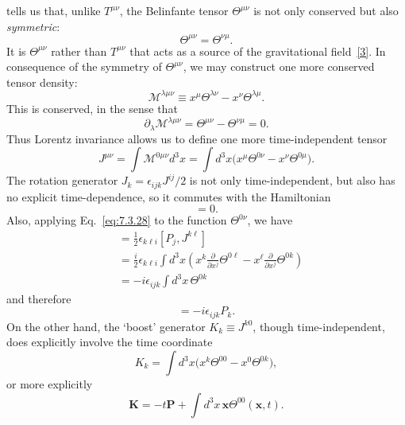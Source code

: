 tells us that, unlike $T^{\mu\nu}$, the Belinfante tensor $\Theta^{\mu\nu}$ is
not only conserved but also \emph{symmetric}:
\begin{equation}
\Theta^{\mu\nu}=\Theta^{\nu\mu}.
\tag{7.4.14}\label{eq:7.4.14}
\end{equation}
It is $\Theta^{\mu\nu}$ rather than $T^{\mu\nu}$ that acts as a source of the
gravitational field~\hyperref[ref:7.3]{[3]}. In consequence of the symmetry of $\Theta^{\mu\nu}$,
we may construct one more conserved tensor density:
\begin{equation}
\mathcal{M}^{\lambda\mu\nu}
\equiv x^\mu\Theta^{\lambda\nu}-x^\nu\Theta^{\lambda\mu}.
\tag{7.4.15}\label{eq:7.4.15}
\end{equation}
This is conserved, in the sense that
\begin{equation}
\partial_\lambda\mathcal{M}^{\lambda\mu\nu}
=\Theta^{\mu\nu}-\Theta^{\nu\mu}=0.
\tag{7.4.16}\label{eq:7.4.16}
\end{equation}
Thus Lorentz invariance allows us to define one more time-independent tensor
\begin{equation}
J^{\mu\nu}=\int\mathcal{M}^{0\mu\nu}d^3x
=\int d^3x\bigl(x^\mu\Theta^{0\nu}-x^\nu\Theta^{0\mu}\bigr).
\tag{7.4.17}\label{eq:7.4.17}
\end{equation}
The rotation generator $J_k=\epsilon_{ijk}J^{ij}/2$ is not only
time-independent, but also has no explicit time-dependence, so it commutes with
the Hamiltonian
\begin{equation}
[H,\mathbf{J}]=0.
\tag{7.4.18}\label{eq:7.4.18}
\end{equation}
Also, applying Eq.~\eqref{eq:7.3.28} to the function $\Theta^{0\nu}$, we have
\begin{align*}
[P_j,J_i]
&=\frac12\epsilon_{k\ell i}[P_j,J^{k\ell}]\\
&=\frac{i}{2}\epsilon_{k\ell i}\int d^3x\left(
x^k\frac{\partial}{\partial x^j}\Theta^{0\ell}
-x^\ell\frac{\partial}{\partial x^j}\Theta^{0k}\right)\\
&=-i\epsilon_{ijk}\int d^3x\,\Theta^{0k}
\end{align*}
and therefore
\begin{equation}
[P_j,J_i]=-i\epsilon_{ijk}P_k.
\tag{7.4.19}\label{eq:7.4.19}
\end{equation}
On the other hand, the `boost' generator $K_k\equiv J^{k0}$, though
time-independent, does explicitly involve the time coordinate
\[
K_k=\int d^3x\bigl(x^k\Theta^{00}-x^0\Theta^{0k}\bigr),
\]
or more explicitly
\begin{equation}
\mathbf{K}=-t\mathbf{P}+\int d^3x\,\mathbf{x}\Theta^{00}(\mathbf{x},t).
\tag{7.4.20}\label{eq:7.4.20}
\end{equation}
